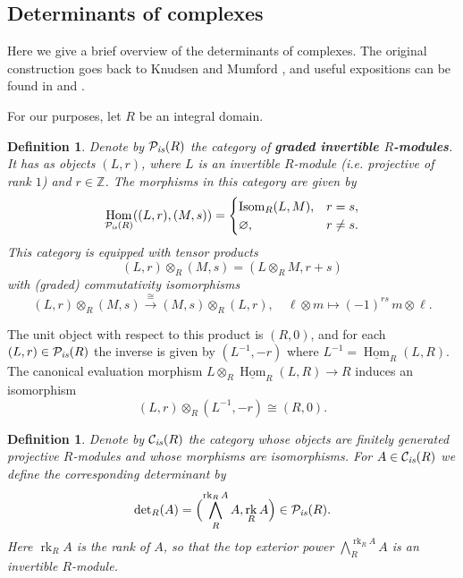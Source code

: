 \documentclass[10pt,a4paper,oneside]{article}
\DeclareMathOperator{\Hom}{Hom}
\DeclareMathOperator{\Isom}{Isom}
\DeclareMathOperator{\rk}{rk}
\newcommand{\ZZ}{\mathbb{Z}}
\renewcommand{\det}{\operatorname{det}}
\renewcommand{\emptyset}{\varnothing}
\newcommand{\is}{\text{\it is}}
\newcommand{\iHom}{\underline{\Hom}}
\theoremstyle{myplain}
\theoremstyle{mydefinition}
\newtheorem{definition}[theorem]{Definition}
\numberwithin{equation}{section}
\begin{document}
\begin{appendices}
\section{Determinants of complexes}
\label{app:determinants}

Here we give a brief overview of the determinants of complexes. The original
construction goes back to Knudsen and Mumford \cite{Knudsen-Mumford-1976}, and
useful expositions can be found in
\cite[Appendix~A]{Gelfand-Kapranov-Zelevinsky-1994} and \cite[\S
2.1]{Kato-1993}.

For our purposes, let $R$ be an integral domain.

\begin{definition}
  Denote by $\mathcal{P}_\is (R)$ the category of
  \textbf{graded invertible $R$-modules}. It has as objects $(L,r)$, where $L$
  is an invertible $R$-module (i.e. projective of rank $1$) and $r \in \ZZ$. The
  morphisms in this category are given by
  \[ \Hom_{\mathcal{P}_\is (R)} ((L,r), (M,s)) = \begin{cases}
      \Isom_R (L,M), & r = s, \\
      \emptyset, & r \ne s.
    \end{cases} \]
  This category is equipped with tensor products
  $$(L,r) \otimes_R (M,s) = (L\otimes_R M, r + s)$$
  with (graded) commutativity isomorphisms
  \[
    (L,r) \otimes_R (M,s)
    \xrightarrow{\cong}
    (M,s) \otimes_R (L,r),
    \quad
    \ell \otimes m \mapsto (-1)^{rs}\,m\otimes \ell.
  \]
\end{definition}

The unit object with respect to this product is $(R,0)$, and for each
$(L,r) \in \mathcal{P}_\is (R)$ the inverse is given by $(L^{-1}, -r)$ where
$L^{-1} = \iHom_R (L,R)$. The canonical evaluation morphism
$L \otimes_R \iHom_R (L,R) \to R$ induces an isomorphism
$$(L,r) \otimes_R (L^{-1}, -r) \cong (R,0).$$

\begin{definition}
  Denote by $\mathcal{C}_\is (R)$ the category whose objects are finitely
  generated projective $R$-modules and whose morphisms are isomorphisms.
  For $A \in \mathcal{C}_\is (R)$ we define the corresponding determinant by
  \begin{equation}
    \label{eqn:det-proj-module}
    \det_R (A) = \Bigl(\bigwedge^{\rk_R A}_R A, \rk_R A\Bigr) \in \mathcal{P}_\is (R).
  \end{equation}
  Here $\rk_R A$ is the rank of $A$, so that the top exterior power
  $\bigwedge^{\rk_R A}_R A$ is an invertible $R$-module.
\end{definition}


\end{appendices}
\end{document}
